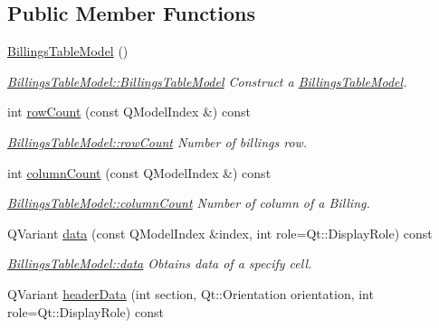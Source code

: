 \subsection*{Public Member Functions}
\begin{DoxyCompactItemize}
\item 
\hyperlink{classGui_1_1Widgets_1_1WdgModels_1_1BillingsTableModel_a7ac53a3ff1222c15e264cff34b830582}{Billings\+Table\+Model} ()
\begin{DoxyCompactList}\small\item\em \hyperlink{classGui_1_1Widgets_1_1WdgModels_1_1BillingsTableModel_a7ac53a3ff1222c15e264cff34b830582}{Billings\+Table\+Model\+::\+Billings\+Table\+Model} Construct a \hyperlink{classGui_1_1Widgets_1_1WdgModels_1_1BillingsTableModel}{Billings\+Table\+Model}. \end{DoxyCompactList}\item 
int \hyperlink{classGui_1_1Widgets_1_1WdgModels_1_1BillingsTableModel_aeda0c27a114bab611363cb46c5119b10}{row\+Count} (const Q\+Model\+Index \&) const 
\begin{DoxyCompactList}\small\item\em \hyperlink{classGui_1_1Widgets_1_1WdgModels_1_1BillingsTableModel_aeda0c27a114bab611363cb46c5119b10}{Billings\+Table\+Model\+::row\+Count} Number of billings row. \end{DoxyCompactList}\item 
int \hyperlink{classGui_1_1Widgets_1_1WdgModels_1_1BillingsTableModel_a361398f7c11d07a2303c4c5236b3c944}{column\+Count} (const Q\+Model\+Index \&) const 
\begin{DoxyCompactList}\small\item\em \hyperlink{classGui_1_1Widgets_1_1WdgModels_1_1BillingsTableModel_a361398f7c11d07a2303c4c5236b3c944}{Billings\+Table\+Model\+::column\+Count} Number of column of a Billing. \end{DoxyCompactList}\item 
Q\+Variant \hyperlink{classGui_1_1Widgets_1_1WdgModels_1_1BillingsTableModel_a2b83574c5ed7a98f1b311e14e4112d13}{data} (const Q\+Model\+Index \&index, int role=Qt\+::\+Display\+Role) const 
\begin{DoxyCompactList}\small\item\em \hyperlink{classGui_1_1Widgets_1_1WdgModels_1_1BillingsTableModel_a2b83574c5ed7a98f1b311e14e4112d13}{Billings\+Table\+Model\+::data} Obtains data of a specify cell. \end{DoxyCompactList}\item 
Q\+Variant \hyperlink{classGui_1_1Widgets_1_1WdgModels_1_1BillingsTableModel_af441051dcb0c702ca9d390405bd8bbc9}{header\+Data} (int section, Qt\+::\+Orientation orientation, int role=Qt\+::\+Display\+Role) const 

\end{DoxyCompactItemize}
